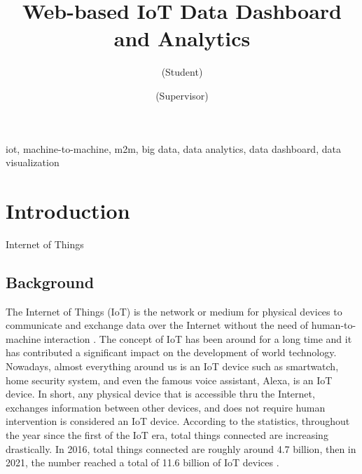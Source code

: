 \documentclass[conference]{IEEEtran}
\begin{document}
\title{Web-based IoT Data Dashboard and Analytics\\}

\author{
(Student)\\
\and
{}
(Supervisor)\\
}

\maketitle

\begin{IEEEkeywords}
iot, machine-to-machine, m2m, big data, data analytics, data dashboard, data visualization
\end{IEEEkeywords}

\section{Introduction}
Internet of Things

\subsection{Background}
The Internet of Things (IoT) is the network or medium for physical devices
to communicate and exchange data over the Internet without the need of
human-to-machine interaction \cite{b1}. The concept of IoT has been around
for a long time and it has contributed a significant impact on the
development of world technology. Nowadays, almost everything around
us is an IoT device such as smartwatch, home security system,
and even the famous voice assistant, Alexa, is an IoT device.
In short, any physical device that is accessible thru the Internet,
exchanges information between other devices, and does not require human
intervention is considered an IoT device. According to the statistics,
throughout the year since the first of the IoT era, total things connected
are increasing drastically. In 2016, total things connected are roughly
around 4.7 billion, then in 2021, the number reached a total of 11.6 billion
of IoT devices \cite{b2}.
\end{document}

